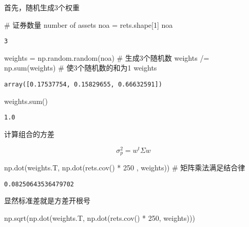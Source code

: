 \documentclass[
  letterpaper,
  DIV=11,
  numbers=noendperiod]{scrreprt}
\newenvironment{Shaded}{\begin{snugshade}}{\end{snugshade}}
\newcommand{\BuiltInTok}[1]{\textcolor[rgb]{0.00,0.23,0.31}{#1}}
\newcommand{\CommentTok}[1]{\textcolor[rgb]{0.37,0.37,0.37}{#1}}
\newcommand{\DecValTok}[1]{\textcolor[rgb]{0.68,0.00,0.00}{#1}}
\newcommand{\NormalTok}[1]{\textcolor[rgb]{0.00,0.23,0.31}{#1}}
\newcommand{\OperatorTok}[1]{\textcolor[rgb]{0.37,0.37,0.37}{#1}}
\begin{document}
首先，随机生成3个权重

\begin{Shaded}
\begin{Highlighting}[]
\CommentTok{\# 证券数量 number of assets}
\NormalTok{noa }\OperatorTok{=}\NormalTok{ rets.shape[}\DecValTok{1}\NormalTok{]}
\NormalTok{noa}
\end{Highlighting}
\end{Shaded}

\begin{verbatim}
3
\end{verbatim}

\begin{Shaded}
\begin{Highlighting}[]
\NormalTok{weights }\OperatorTok{=}\NormalTok{ np.random.random(noa) }\CommentTok{\# 生成3个随机数}
\NormalTok{weights }\OperatorTok{/=}\NormalTok{ np.}\BuiltInTok{sum}\NormalTok{(weights) }\CommentTok{\# 使3个随机数的和为1}
\NormalTok{weights}
\end{Highlighting}
\end{Shaded}

\begin{verbatim}
array([0.17537754, 0.15829655, 0.66632591])
\end{verbatim}

\begin{Shaded}
\begin{Highlighting}[]
\NormalTok{weights.}\BuiltInTok{sum}\NormalTok{()}
\end{Highlighting}
\end{Shaded}

\begin{verbatim}
1.0
\end{verbatim}

计算组合的方差

\[
\sigma_p^2 = w^t \Sigma w
\]

\begin{Shaded}
\begin{Highlighting}[]
\NormalTok{np.dot(weights.T, np.dot(rets.cov() }\OperatorTok{*} \DecValTok{250}\NormalTok{ , weights)) }\CommentTok{\# 矩阵乘法满足结合律}
\end{Highlighting}
\end{Shaded}

\begin{verbatim}
0.08250643536479702
\end{verbatim}

显然标准差就是方差开根号

\begin{Shaded}
\begin{Highlighting}[]
\NormalTok{np.sqrt(np.dot(weights.T, np.dot(rets.cov() }\OperatorTok{*} \DecValTok{250}\NormalTok{, weights))) }
\end{Highlighting}
\end{Shaded}
\end{document}
